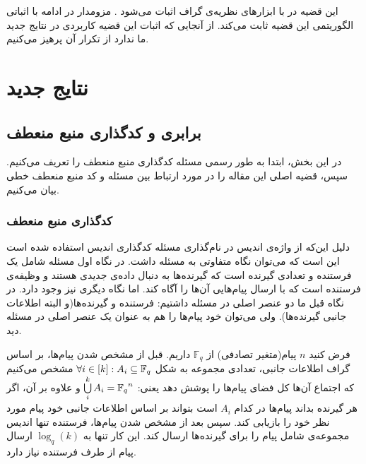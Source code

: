  این قضیه در
 \cite{4691014}
 با ابزارهای نظریه‌ی گراف اثبات می‌شود . مزومدار در ادامه با اثباتی الگوریتمی این قضیه ثابت می‌کند. از آنجایی که اثبات این قضیه کاربردی در نتایج جدید ما ندارد از تکرار آن پرهیز می‌کنیم.
 \newpage
\section{نتایج جدید}
\label{sec3}
\subsection{
	برابری 
	\picod
	 و کدگذاری منبع منعطف
}
در این بخش، ابتدا به طور رسمی مسئله کدگذاری منبع منعطف را تعریف می‌کنیم. سپس، قضیه اصلی این مقاله را در مورد ارتباط بین مسئله 
\picod
 و کد منبع منعطف خطی بیان می‌کنیم.
\subsubsection{
		کدگذاری منبع منعطف
}
\begin{recal}
	دلیل این‌که از واژه‌ی اندیس در نام‌گذاری مسئله کدگذاری اندیس استفاده شده است این است که می‌توان نگاه متفاوتی به مسئله داشت. در نگاه اول مسئله شامل یک فرستنده و تعدادی گیرنده است که گیرنده‌ها به دنبال داده‌ی جدیدی هستند و وظیفه‌ی فرستنده است که با ارسال پیام‌هایی آن‌ها را آگاه کند. اما نگاه دیگری نیز وجود دارد. در نگاه قبل ما دو عنصر اصلی در مسئله داشتیم: فرستنده و گیرنده‌ها(و البته اطلاعات جانبی گیرنده‌ها). ولی می‌توان خود پیام‌ها را هم به عنوان یک عنصر اصلی در مسئله دید.
	
فرض کنید 
$n$
پیام(متغیر‌ تصادفی) از
$\mathbb{F}_q$
 داریم. قبل از مشخص شدن پیام‌ها، بر اساس گراف اطلاعات جانبی، تعدادی مجموعه به شکل
 $\forall i \in [k]: A_i \subseteq {\mathbb{F}_q}$
 مشخص می‌کنیم که اجتماع آن‌ها کل فضای پیام‌ها را پوشش دهد یعنی:
 $ \bigcup\limits_i^k A_i = {\mathbb{F}_q}^n $
 و علاوه بر آن، اگر هر گیرنده بداند پیام‌ها در کدام
 $A_i$
 است بتواند بر اساس اطلاعات جانبی خود پیام مورد نظر خود را بازیابی کند. سپس بعد از مشخص شدن پیام‌ها، فرستنده تنها اندیس مجموعه‌ی شامل پیام را برای گیرنده‌ها ارسال کند. این کار تنها به
 $\log_q(k)$
 ارسال پیام از طرف فرستنده نیاز دارد.
\end{recal}

